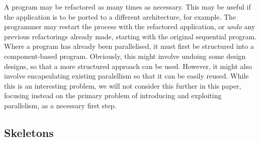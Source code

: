 \documentclass[smallextended]{svjour3}
\newcommand{\cbcomment}[1]{\comment{CB}{#1}}
\begin{document}
\noindent
A program may be refactored as many times as necessary.
This may be useful if the application is to be ported to a different
architecture, for example.
The programmer may restart the process
 with the refactored application, or \emph{undo} any previous refactorings already made, starting 
with the original sequential program.
%
Where a program has already been parallelised, it must first be structured into a component-based program.  Obviously, this might
involve undoing some design designs, so that a more structured approach can be used.  However, it might also involve encapsulating
existing paralellism so that it can be easily reused.  While this is an interesting problem, we will not consider this further in this paper,
focusing instead on the primary problem of introducing and exploiting parallelism, as a necessary first step.

%

\subsection{Skeletons} \label{sec:skeletons}
\end{document}
